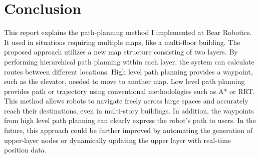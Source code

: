 \documentclass[en]{snu-cse-bsc-thesis}
\begin{document}
\chapter{Conclusion}\label{chap:conclusion}
This report explains the path-planning method I implemented at Bear Robotics. It used in situations requiring multiple maps, like a multi-floor building. The proposed approach utilizes a new map structure consisting of two layers. By performing hierarchical path planning within each layer, the system can calculate routes between different locations. High level path planning provides a waypoint, such as the elevator, needed to move to another map. Low level path planning provides path or trajectory using conventional methodologies such as A* or RRT. This method allows robots to navigate freely across large spaces and accurately reach their destinations, even in multi-story buildings. In addition, the waypoints from high level path planning can clearly express the robot's path to users. In the future, this approach could be further improved by automating the generation of upper-layer nodes or dynamically updating the upper layer with real-time position data.

\printbibliography

\begin{abstract}[ko]
본 보고서에서는 여러 개의 지도를 활용하는 로봇을 위한 계층적 경로 계획 기법을 제안한다. 제안된 방법은 두 개의 layer로 구성된 하이브리드 맵 구조를 사용한다. 상위 layer는 그래프 구조로, 지도 간의 전환과 주요 경유지를 나타내며, 하위 layer는 점유 그리드 맵을 활용하여 정밀한 이동을 가능하게 한다.  

경로 계획은 세 단계로 이루어진다. 첫째, 로봇의 현재 위치를 상위 layer의 그래프에 새로운 노드로 추가한다. 둘째, 최단 경로 알고리즘을 사용하여 로봇이 거쳐야 할 waypoint를 계산한다. 셋째, 하위 layer에서 실시간 위치 및 장애물 정보를 고려하여 waypoint 간의 세부 이동 경로를 생성한다.  

이 방법은 수평 지도 전환 지점(Horizontal Map Change Point)과 엘리베이터 노드를 활용하여 넓은 공간 및 다층 건물에서도 원활한 이동을 가능하게 한다. 또한 확장성과 유연성을 보장하여 로봇이 광범위한 환경에서도 효과적으로 작동할 수 있도록 한다. 향후 연구에서는 상위 layer의 노드를 자동으로 생성하거나 실시간으로 업데이트하는 방식을 도입하여 적응성을 더욱 향상할 예정이다.

\end{abstract}
\end{document}
